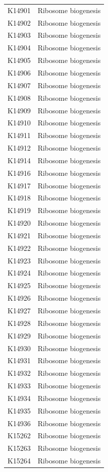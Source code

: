 \begin{longtable}{@{}l l@{}}
K14901 & Ribosome biogenesis \\
K14902 & Ribosome biogenesis \\
K14903 & Ribosome biogenesis \\
K14904 & Ribosome biogenesis \\
K14905 & Ribosome biogenesis \\
K14906 & Ribosome biogenesis \\
K14907 & Ribosome biogenesis \\
K14908 & Ribosome biogenesis \\
K14909 & Ribosome biogenesis \\
K14910 & Ribosome biogenesis \\
K14911 & Ribosome biogenesis \\
K14912 & Ribosome biogenesis \\
K14914 & Ribosome biogenesis \\
K14916 & Ribosome biogenesis \\
K14917 & Ribosome biogenesis \\
K14918 & Ribosome biogenesis \\
K14919 & Ribosome biogenesis \\
K14920 & Ribosome biogenesis \\
K14921 & Ribosome biogenesis \\
K14922 & Ribosome biogenesis \\
K14923 & Ribosome biogenesis \\
K14924 & Ribosome biogenesis \\
K14925 & Ribosome biogenesis \\
K14926 & Ribosome biogenesis \\
K14927 & Ribosome biogenesis \\
K14928 & Ribosome biogenesis \\
K14929 & Ribosome biogenesis \\
K14930 & Ribosome biogenesis \\
K14931 & Ribosome biogenesis \\
K14932 & Ribosome biogenesis \\
K14933 & Ribosome biogenesis \\
K14934 & Ribosome biogenesis \\
K14935 & Ribosome biogenesis \\
K14936 & Ribosome biogenesis \\
K15262 & Ribosome biogenesis \\
K15263 & Ribosome biogenesis \\
K15264 & Ribosome biogenesis \\

\end{longtable}
